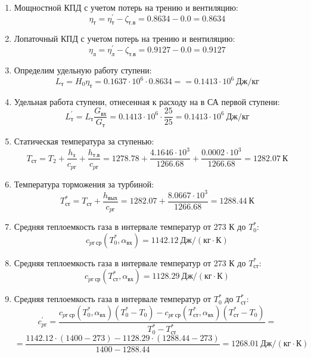 \documentclass[a4paper,10pt]{article}
\begin{document}
\begin{enumerate}
        \item Мощностной КПД с учетом потерь на трению и вентиляцию:
        \[
            \eta_т = \eta_т^\prime - \zeta_{т.в} =
                0.8634 - 0.0 =
            0.8634
        \]

        \item Лопаточный КПД с учетом потерь на трению и вентиляцию:
        \[
            \eta_л = \eta_л^\prime - \zeta_{т.в} =
                0.9127 - 0.0 =
            0.9127
        \]

        \item Определим удельную работу ступени:
        \[
            L_т = H_0 \eta_т = 0.1637 \cdot 10^6 \cdot 0.8634 =
            = 0.1413 \cdot 10^6 \ Дж/кг
        \]

        \item Удельная работа ступени, отнесенная к расходу на в СА первой ступени:
        \[
            L_т^\prime = L_т \frac{ G_{вх} }{ G_т }  =
                0.1413 \cdot 10^6 \cdot
                \frac{ 25 }{ 25 } =
            0.1413 \cdot 10^6 \ Дж/кг
        \]

        \item Статическая температура за ступенью:
        \[
            T_{ст} = T_2 + \frac{ h_з }{ c_{pг} } + \frac{ h_{т.в} }{ c_{pг} } =
                1278.78 +
                \frac{4.1646 \cdot 10^3 }{ 1266.68 } +
                \frac{ 0.0002 \cdot 10^3 }{ 1266.68 } =
            1282.07 \ К
        \]

        \item Температура торможения за турбиной:
        \[
            T_{ст}^* = T_{ст} + \frac{ h_{вых} }{ c_{pг} } =
                1282.07 +
                \frac{ 8.0667 \cdot 10^3 }{ 1266.68 } =
            1288.44 \ К
        \]

        \item Средняя теплоемкость газа в интервале температур от 273 К до $T_0^*$:
        \[
            c_{pг\ ср} (T_0^*, \alpha_{вх}) =
            1142.12 \ Дж/(кг \cdot К)
        \]

        \item Средняя теплоемкость газа в интервале температур от 273 К до $T_{ст}^*$:
        \[
            c_{pг\ ср} (T_{ст}^*, \alpha_{вх}) =
            1128.29 \ Дж/(кг \cdot К)
        \]

        \item Средняя теплоемкость газа в интервале температур от $T_0^*$ до $T_{ст}^*$:
        \[
            c_{pг}^\prime = \frac{
		        c_{pг\ ср} (T_0^*, \alpha_{вх}) (T_0^* - T_0) - c_{pг\ ср} (T_{ст}^*, \alpha_{вх})(T_{ст}^* - T_0)
		    }{
		        T_0^* - T_{ст}^*} =\]
        \[    =\frac{
		        1142.12 \cdot
                (1400 - 273) -
		        1128.29 \cdot
                (1288.44 - 273)
		    }{
		        1400 - 1288.44} =
		    1268.01 \ Дж / (кг \cdot К)
        \]


\end{enumerate}
\end{document}
